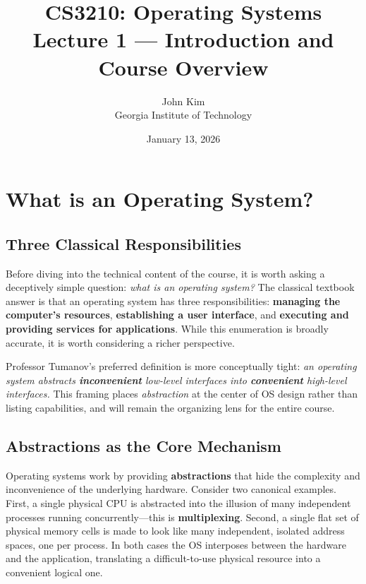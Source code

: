 \documentclass[11pt]{article}
\title{\textbf{CS3210: Operating Systems} \\ Lecture 1 --- Introduction and Course Overview}
\author{John Kim \\ Georgia Institute of Technology}
\date{January 13, 2026}
\begin{document}
\maketitle
\tableofcontents
\newpage

\section{What is an Operating System?}

\subsection{Three Classical Responsibilities}

Before diving into the technical content of the course, it is worth asking a deceptively simple
question: \emph{what is an operating system?} The classical textbook answer is that an operating
system has three responsibilities: \textbf{managing the computer's resources}, \textbf{establishing
a user interface}, and \textbf{executing and providing services for applications}. While this
enumeration is broadly accurate, it is worth considering a richer perspective.

Professor Tumanov's preferred definition is more conceptually tight: \emph{an operating system
abstracts \textbf{inconvenient} low-level interfaces into \textbf{convenient} high-level
interfaces.} This framing places \emph{abstraction} at the center of OS design rather than
listing capabilities, and will remain the organizing lens for the entire course.

\subsection{Abstractions as the Core Mechanism}

Operating systems work by providing \textbf{abstractions} that hide the complexity and inconvenience
of the underlying hardware. Consider two canonical examples. First, a single physical CPU is
abstract\-ed into the illusion of many independent processes running concurrently---this is
\textbf{multiplexing}. Second, a single flat set of physical memory cells is made to look like
many independent, isolated address spaces, one per process. In both cases the OS interposes
between the hardware and the application, translating a difficult-to-use physical resource into
a convenient logical one.
\end{document}
